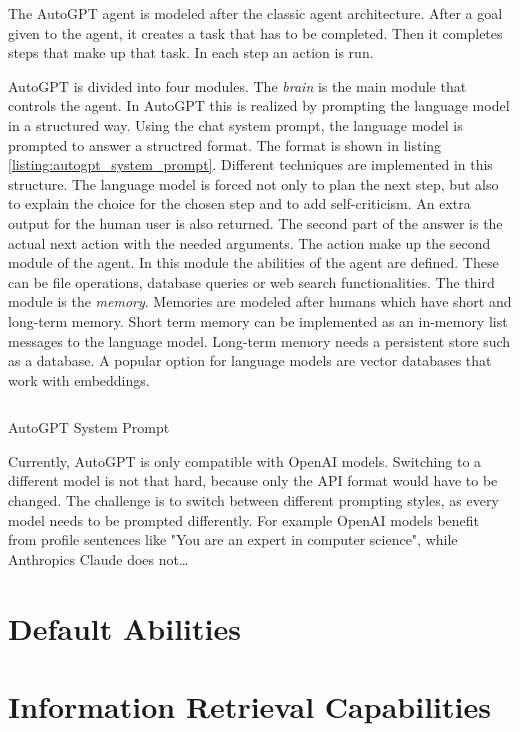 \documentclass[english, version-2022-01]{uzl-thesis}
\begin{document}
The AutoGPT agent is modeled after the classic agent architecture. After a goal given to the agent, it creates a task that has to be completed. Then it completes steps that make up that task. In each step an action is run.

AutoGPT is divided into four modules. The \textit{brain} is the main module that controls the agent. In AutoGPT this is realized by prompting the language model in a structured way. Using the chat system prompt, the language model is prompted to answer a structred format. The format is shown in listing \ref{listing:autogpt_system_prompt}. Different techniques are implemented in this structure. The language model is forced not only to plan the next step, but also to explain the choice for the chosen step and to add self-criticism. An extra output for the human user is also returned. The second part of the answer is the actual next action with the needed arguments. The action make up the second module of the agent. In this module the abilities of the agent are defined. These can be file operations, database queries or web search functionalities. The third module is the \textit{memory}. Memories are modeled after humans which have short and long-term memory. Short term memory can be implemented as an in-memory list messages to the language model. Long-term memory needs a persistent store such as a database. A popular option for language models are vector databases that work with embeddings.

\begin{listing}
	\inputminted{jinja}{include/code/system-format.j2}
	\caption{AutoGPT System Prompt}
	\label{listing:autogpt_system_prompt}
\end{listing}

Currently, AutoGPT is only compatible with OpenAI models. Switching to a different model is not that hard, because only the API format would have to be changed. The challenge is to switch between different prompting styles, as every model needs to be prompted differently. For example OpenAI models benefit from profile sentences like "You are an expert in computer science", while Anthropics Claude does not\dots

\section{Default Abilities}

\section{Information Retrieval Capabilities}
\end{document}
